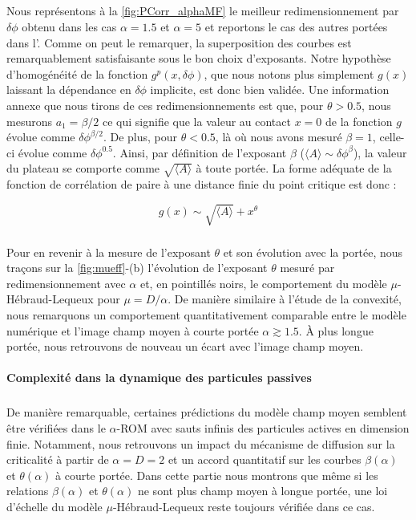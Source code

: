 \subparagraph{}Nous représentons à la \autoref{fig:PCorr_alphaMF} le meilleur redimensionnement par $\delta\phi$ obtenu dans les cas $\alpha = 1.5$ et $\alpha=5$ et reportons le cas des autres portées dans l'. Comme on peut le remarquer, la superposition des courbes est remarquablement satisfaisante sous le bon choix d'exposants. Notre hypothèse d'homogénéité de la fonction $g^p(x, \delta\phi)$, que nous notons plus simplement $g(x)$ laissant la dépendance en $\delta\phi$ implicite, est donc bien validée. Une information annexe que nous tirons de ces redimensionnements est que, pour $\theta>0.5$, nous mesurons $a_1 = \beta/2$ ce qui signifie que la valeur au contact $x=0$ de la fonction $g$ évolue comme $\delta\phi^{\beta/2}$. De plus, pour $\theta<0.5$, là où nous avons mesuré $\beta=1$, celle-ci évolue comme $\delta\phi^{0.5}$. Ainsi, par définition de l'exposant $\beta$ ($\langle A \rangle \sim \delta\phi^\beta$), la valeur du plateau se comporte comme $\sqrt{\langle A \rangle}$ à toute portée. La forme adéquate de la fonction de corrélation de paire à une distance finie du point critique est donc :

\begin{equation}
	g(x) \sim \sqrt{\langle A \rangle} + x^\theta
	\label{eq:scalinggx}
\end{equation}

\subparagraph{}Pour en revenir à la mesure de l'exposant $\theta$ et son évolution avec la portée, nous traçons sur la \autoref{fig:mueff}-(b) l'évolution de l'exposant $\theta$ mesuré par redimensionnement avec $\alpha$ et, en pointillés noirs, le comportement du modèle $\mu$-Hébraud-Lequeux pour $\mu = D / \alpha$. De manière similaire à l'étude de la convexité, nous remarquons un comportement quantitativement comparable entre le modèle numérique et l'image champ moyen à courte portée $\alpha \gtrsim 1.5$. \`A plus longue portée, nous retrouvons de nouveau un écart avec l'image champ moyen.

\paragraph{Complexité dans la dynamique des particules passives}

\subparagraph{}De manière remarquable, certaines prédictions du modèle champ moyen semblent être vérifiées dans le $\alpha$-ROM avec sauts infinis des particules actives en dimension finie. Notamment, nous retrouvons un impact du mécanisme de diffusion sur la criticalité à partir de $\alpha = D = 2$ et un accord quantitatif sur les courbes $\beta(\alpha)$ et $\theta(\alpha)$ à courte portée. Dans cette partie nous montrons que même si les relations $\beta(\alpha)$ et $\theta(\alpha)$ ne sont plus champ moyen à longue portée, une loi d'échelle du modèle $\mu$-Hébraud-Lequeux reste toujours vérifiée dans ce cas.

